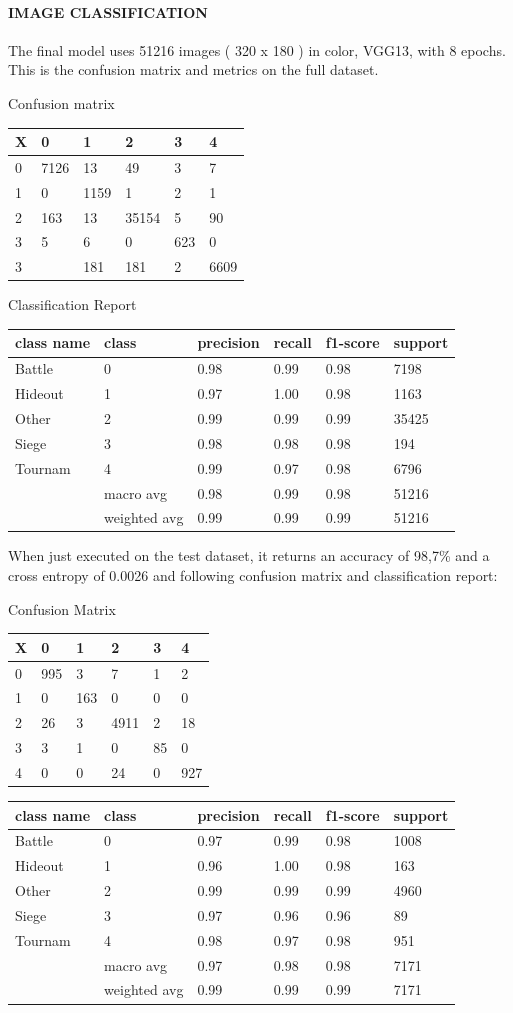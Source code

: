 \documentclass[
]{article}
\begin{document}
\hypertarget{image-classification}{%
\paragraph{IMAGE CLASSIFICATION}\label{image-classification}}

The final model uses 51216 images ( 320 x 180 ) in color, VGG13, with 8
epochs. This is the confusion matrix and metrics on the full dataset.

Confusion matrix

\begin{longtable}[]{@{}llllll@{}}
\toprule
X & 0 & 1 & 2 & 3 & 4\tabularnewline
\midrule
\endhead
0 & 7126 & 13 & 49 & 3 & 7\tabularnewline
1 & 0 & 1159 & 1 & 2 & 1\tabularnewline
2 & 163 & 13 & 35154 & 5 & 90\tabularnewline
3 & 5 & 6 & 0 & 623 & 0\tabularnewline
3 & & 181 & 181 & 2 & 6609\tabularnewline
\bottomrule
\end{longtable}

Classification Report

\begin{longtable}[]{@{}llllll@{}}
\toprule
class name & class & precision & recall & f1-score &
support\tabularnewline
\midrule
\endhead
Battle & 0 & 0.98 & 0.99 & 0.98 & 7198\tabularnewline
Hideout & 1 & 0.97 & 1.00 & 0.98 & 1163\tabularnewline
Other & 2 & 0.99 & 0.99 & 0.99 & 35425\tabularnewline
Siege & 3 & 0.98 & 0.98 & 0.98 & 194\tabularnewline
Tournam & 4 & 0.99 & 0.97 & 0.98 & 6796\tabularnewline
& macro avg & 0.98 & 0.99 & 0.98 & 51216\tabularnewline
& weighted avg & 0.99 & 0.99 & 0.99 & 51216\tabularnewline
\bottomrule
\end{longtable}

When just executed on the test dataset, it returns an accuracy of 98,7\%
and a cross entropy of 0.0026 and following confusion matrix and
classification report:

Confusion Matrix

\begin{longtable}[]{@{}llllll@{}}
\toprule
X & 0 & 1 & 2 & 3 & 4\tabularnewline
\midrule
\endhead
0 & 995 & 3 & 7 & 1 & 2\tabularnewline
1 & 0 & 163 & 0 & 0 & 0\tabularnewline
2 & 26 & 3 & 4911 & 2 & 18\tabularnewline
3 & 3 & 1 & 0 & 85 & 0\tabularnewline
4 & 0 & 0 & 24 & 0 & 927\tabularnewline
\bottomrule
\end{longtable}

\begin{longtable}[]{@{}llllll@{}}
\toprule
class name & class & precision & recall & f1-score &
support\tabularnewline
\midrule
\endhead
Battle & 0 & 0.97 & 0.99 & 0.98 & 1008\tabularnewline
Hideout & 1 & 0.96 & 1.00 & 0.98 & 163\tabularnewline
Other & 2 & 0.99 & 0.99 & 0.99 & 4960\tabularnewline
Siege & 3 & 0.97 & 0.96 & 0.96 & 89\tabularnewline
Tournam & 4 & 0.98 & 0.97 & 0.98 & 951\tabularnewline
& macro avg & 0.97 & 0.98 & 0.98 & 7171\tabularnewline
& weighted avg & 0.99 & 0.99 & 0.99 & 7171\tabularnewline
\bottomrule
\end{longtable}
\end{document}
